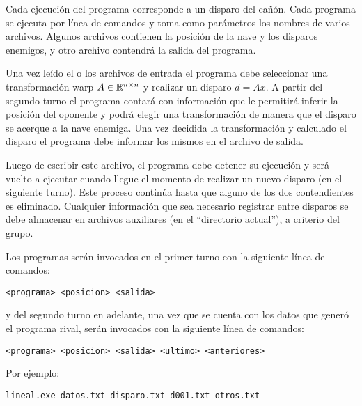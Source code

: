 Cada ejecuci\'on del programa corresponde a un disparo del ca\~n\'on. Cada programa se ejecuta por l\'inea de comandos y toma
como par\'ametros los nombres de varios archivos. Algunos archivos contienen
la posici\'on de la nave y los disparos enemigos, y otro archivo contendr\'a la salida del programa.

Una vez le\'ido el o los archivos de entrada el programa debe seleccionar una transformaci\'on warp $A \in 
\mathbb{R}^{n \times n}$ y realizar un disparo $d = A x$. A partir del segundo turno el programa contar\'a 
con informaci\'on que le permitir\'a inferir la posici\'on del oponente y podr\'a elegir una transformaci\'on
de manera que el disparo se acerque a la nave enemiga. Una vez decidida la transformaci\'on y calculado el disparo
el programa debe informar los mismos en el archivo de salida.

Luego de escribir este archivo, el programa debe detener su ejecuci\'on y ser\'a vuelto a ejecutar
cuando llegue el momento de realizar un nuevo disparo (en el siguiente turno). 
Este proceso contin\'ua hasta que alguno de los dos contendientes es eliminado.
Cualquier
informaci\'on que sea necesario registrar entre disparos se debe almacenar en archivos auxiliares (en el ``directorio actual''),
a criterio del grupo. 

Los programas ser\'an invocados en el primer turno con la siguiente l\'inea de comandos:

\verb|<programa> <posicion> <salida>|

y del segundo turno en adelante, una vez que se cuenta con los datos que gener\'o el programa
rival, ser\'an invocados con la siguiente l\'inea de comandos:

\verb|<programa> <posicion> <salida> <ultimo> <anteriores>|

Por ejemplo:

\verb|lineal.exe datos.txt disparo.txt d001.txt otros.txt|

